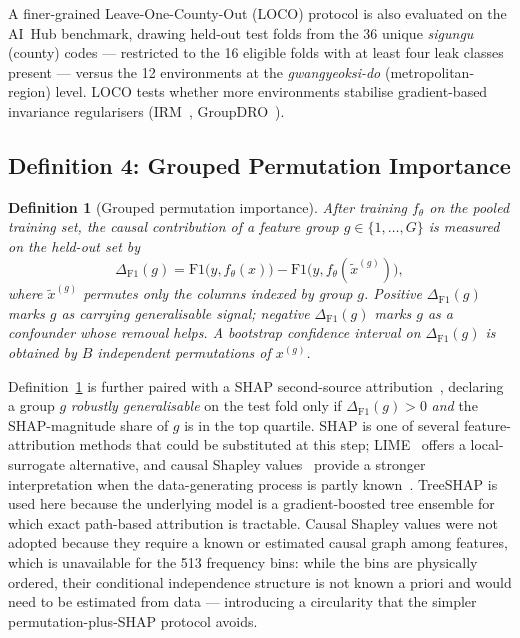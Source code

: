 \documentclass[3p,times,authoryear]{elsarticle}
\newtheorem{definition}{Definition}
\theoremstyle{remark}
\begin{document}
A finer-grained Leave-One-County-Out (LOCO) protocol is also
evaluated on the AI~Hub benchmark, drawing held-out test folds
from the 36 unique \textit{sigungu} (county) codes — restricted to the 16
eligible folds with at least four leak classes present —
versus the 12 environments at the \textit{gwangyeoksi-do} (metropolitan-region)
level. LOCO tests whether more environments stabilise
gradient-based invariance regularisers
(IRM~\cite{arjovsky2019irm}, GroupDRO~\cite{sagawa2020groupdro}).

\subsection{Definition 4: Grouped Permutation Importance}\label{sec:method-perm}

\begin{definition}[Grouped permutation importance]\label{def:perm}
After training $f_\theta$ on the pooled training set, the causal
contribution of a feature group $g \in \{1,\dots,G\}$ is measured
on the held-out set by
\[
\Delta_{\mathrm{F1}}(g) =
  \mathrm{F1}\bigl(y, f_\theta(x)\bigr)
  - \mathrm{F1}\bigl(y, f_\theta(\tilde{x}^{(g)})\bigr),
\]
where $\tilde{x}^{(g)}$ permutes only the columns indexed by
group $g$. Positive $\Delta_{\mathrm{F1}}(g)$ marks $g$ as
carrying generalisable signal; negative $\Delta_{\mathrm{F1}}(g)$
marks $g$ as a confounder whose removal helps. A bootstrap
confidence interval on $\Delta_{\mathrm{F1}}(g)$ is obtained by
$B$ independent permutations of $x^{(g)}$.
\end{definition}

Definition~\ref{def:perm} is further paired with a SHAP
second-source attribution~\cite{lundberg2017shap}, declaring a
group $g$ \emph{robustly generalisable} on the test fold only if
$\Delta_{\mathrm{F1}}(g) > 0$ \emph{and} the SHAP-magnitude
share of $g$ is in the top quartile. SHAP is one of several
feature-attribution methods that could be substituted at this
step; LIME~\cite{ribeiro2016lime} offers a local-surrogate
alternative, and causal Shapley
values~\cite{janzing2020shapley} provide a stronger
interpretation when the data-generating process is partly
known~\cite{lipton2018mythos,barredo2020xai}. TreeSHAP is used here because the underlying model is a
gradient-boosted tree ensemble for which exact path-based
attribution is tractable. Causal Shapley values were not
adopted because they require a known or estimated causal
graph among features, which is unavailable for the 513
frequency bins: while the bins are physically ordered, their
conditional independence structure is not known a priori and
would need to be estimated from data --- introducing a
circularity that the simpler permutation-plus-SHAP protocol
avoids.
\end{document}
